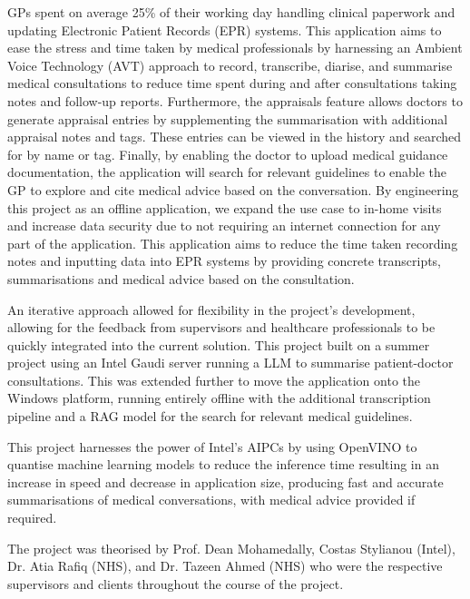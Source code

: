GPs spent on average 25\% of their working day handling clinical paperwork and updating Electronic Patient Records (EPR) systems. This application aims to ease the stress and time taken by medical professionals by harnessing an Ambient Voice Technology (AVT) approach to record, transcribe, diarise, and summarise medical consultations to reduce time spent during and after consultations taking notes and follow-up reports. Furthermore, the appraisals feature allows doctors to generate appraisal entries by supplementing the summarisation with additional appraisal notes and tags. These entries can be viewed in the history and searched for by name or tag. Finally, by enabling the doctor to upload medical guidance documentation, the application will search for relevant guidelines to enable the GP to explore and cite medical advice based on the conversation. By engineering this project as an offline application, we expand the use case to in-home visits and increase data security due to not requiring an internet connection for any part of the application. This application aims to reduce the time taken recording notes and inputting data into EPR systems by providing concrete transcripts, summarisations and medical advice based on the consultation.

An iterative approach allowed for flexibility in the project's development, allowing for the feedback from supervisors and healthcare professionals to be quickly integrated into the current solution. This project built on a summer project using an Intel Gaudi server running a LLM to summarise patient-doctor consultations. This was extended further to move the application onto the Windows platform, running entirely offline with the additional transcription pipeline and a RAG model for the search for relevant medical guidelines.

This project harnesses the power of Intel's AIPCs by using OpenVINO to quantise machine learning models to reduce the inference time resulting in an increase in speed and decrease in application size, producing fast and accurate summarisations of medical conversations, with medical advice provided if required.

The project was theorised by Prof. Dean Mohamedally, Costas Stylianou (Intel), Dr. Atia Rafiq (NHS), and Dr. Tazeen Ahmed (NHS) who were the respective supervisors and clients throughout the course of the project.